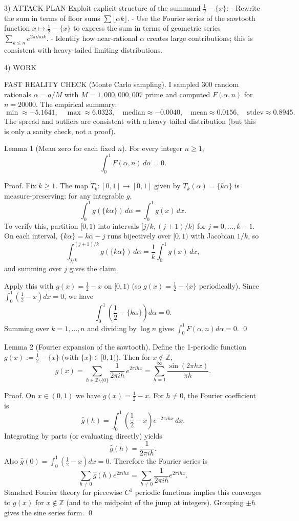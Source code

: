 3) ATTACK PLAN
Exploit explicit structure of the summand $\frac12-\{x\}$:
- Rewrite the sum in terms of floor sums $\sum\lfloor \alpha k\rfloor$.
- Use the Fourier series of the sawtooth function $x\mapsto \frac12-\{x\}$ to express the sum in terms of geometric series $\sum_{k\le n} e^{2\pi i h\alpha k}$.
- Identify how near-rational $\alpha$ creates large contributions; this is consistent with heavy-tailed limiting distributions.

4) WORK

FAST REALITY CHECK (Monte Carlo sampling).
I sampled $300$ random rationals $\alpha=a/M$ with $M=1{,}000{,}000{,}007$ prime and computed $F(\alpha,n)$ for $n=20000$.
The empirical summary:
\[
\min\approx -5.1641,\quad \max\approx 6.0323,\quad \text{median}\approx -0.0040,\quad \text{mean}\approx 0.0156,\quad \text{stdev}\approx 0.8945.
\]
The spread and outliers are consistent with a heavy-tailed distribution (but this is only a sanity check, not a proof).

Lemma 1 (Mean zero for each fixed $n$).
For every integer $n\ge 1$,
\[
\int_0^1 F(\alpha,n)\,d\alpha = 0.
\]

Proof.
Fix $k\ge 1$.  The map $T_k:[0,1]\to[0,1]$ given by $T_k(\alpha)=\{k\alpha\}$ is measure-preserving: for any integrable $g$,
\[
\int_0^1 g(\{k\alpha\})\,d\alpha = \int_0^1 g(x)\,dx.
\]
To verify this, partition $[0,1)$ into intervals $[j/k,(j+1)/k)$ for $j=0,\dots,k-1$.  On each interval, $\{k\alpha\}=k\alpha-j$ runs bijectively over $[0,1)$ with Jacobian $1/k$, so
\[
\int_{j/k}^{(j+1)/k} g(\{k\alpha\})\,d\alpha = \frac{1}{k}\int_0^1 g(x)\,dx,
\]
and summing over $j$ gives the claim.

Apply this with $g(x)=\frac12-x$ on $[0,1)$ (so $g(x)=\frac12-\{x\}$ periodically).  Since $\int_0^1 (\frac12-x)dx=0$, we have
\[
\int_0^1 \left(\frac12-\{k\alpha\}\right)d\alpha = 0.
\]
Summing over $k=1,\dots,n$ and dividing by $\log n$ gives $\int_0^1 F(\alpha,n)d\alpha=0$. \qed

Lemma 2 (Fourier expansion of the sawtooth).
Define the 1-periodic function $g(x):=\frac12-\{x\}$ (with $\{x\}\in[0,1)$).  Then for $x\notin\mathbb{Z}$,
\[
 g(x) = \sum_{h\in\mathbb{Z}\setminus\{0\}} \frac{1}{2\pi i h}\,e^{2\pi i h x}
 = \sum_{h=1}^\infty \frac{\sin(2\pi h x)}{\pi h}.
\]

Proof.
On $x\in(0,1)$ we have $g(x)=\frac12-x$.  For $h\neq 0$, the Fourier coefficient is
\[
\widehat g(h)=\int_0^1 \left(\frac12-x\right)e^{-2\pi i h x}\,dx.
\]
Integrating by parts (or evaluating directly) yields
\[
\widehat g(h)=\frac{1}{2\pi i h}.
\]
Also $\widehat g(0)=\int_0^1 (\frac12-x)dx=0$.  Therefore the Fourier series is
\[
\sum_{h\neq 0} \widehat g(h)e^{2\pi i h x} = \sum_{h\neq 0} \frac{1}{2\pi i h}e^{2\pi i h x}.
\]
Standard Fourier theory for piecewise $C^1$ periodic functions implies this converges to $g(x)$ for $x\notin\mathbb{Z}$ (and to the midpoint of the jump at integers).  Grouping $\pm h$ gives the sine series form. \qed

